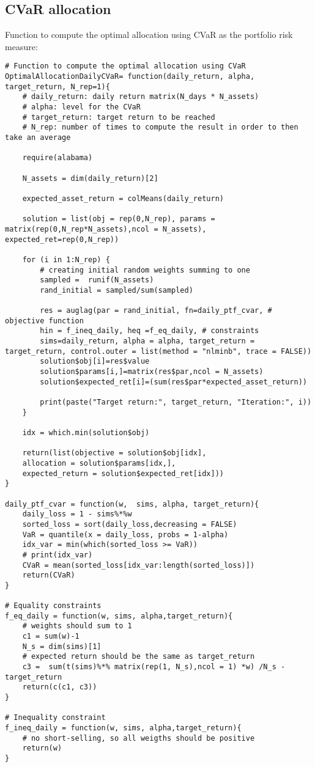 \subsection{CVaR allocation}

Function to compute the optimal allocation using CVaR as the portfolio risk measure:

\begin{lstlisting}
# Function to compute the optimal allocation using CVaR
OptimalAllocationDailyCVaR= function(daily_return, alpha, target_return, N_rep=1){
	# daily_return: daily return matrix(N_days * N_assets)
	# alpha: level for the CVaR
	# target_return: target return to be reached
	# N_rep: number of times to compute the result in order to then take an average
	
	require(alabama)
	
	N_assets = dim(daily_return)[2]
	
	expected_asset_return = colMeans(daily_return)
	
	solution = list(obj = rep(0,N_rep), params = matrix(rep(0,N_rep*N_assets),ncol = N_assets), expected_ret=rep(0,N_rep))
	
	for (i in 1:N_rep) {
		# creating initial random weights summing to one
		sampled =  runif(N_assets)
		rand_initial = sampled/sum(sampled)
		
		res = auglag(par = rand_initial, fn=daily_ptf_cvar, # objective function
		hin = f_ineq_daily, heq =f_eq_daily, # constraints
		sims=daily_return, alpha = alpha, target_return = target_return, control.outer = list(method = "nlminb", trace = FALSE))
		solution$obj[i]=res$value
		solution$params[i,]=matrix(res$par,ncol = N_assets)
		solution$expected_ret[i]=(sum(res$par*expected_asset_return))
		
		print(paste("Target return:", target_return, "Iteration:", i))
	}
	
	idx = which.min(solution$obj)
	
	return(list(objective = solution$obj[idx], 
	allocation = solution$params[idx,],
	expected_return = solution$expected_ret[idx]))
}

daily_ptf_cvar = function(w,  sims, alpha, target_return){
	daily_loss = 1 - sims%*%w
	sorted_loss = sort(daily_loss,decreasing = FALSE)
	VaR = quantile(x = daily_loss, probs = 1-alpha)
	idx_var = min(which(sorted_loss >= VaR))
	# print(idx_var)
	CVaR = mean(sorted_loss[idx_var:length(sorted_loss)])
	return(CVaR)
}

# Equality constraints
f_eq_daily = function(w, sims, alpha,target_return){
	# weights should sum to 1
	c1 = sum(w)-1 
	N_s = dim(sims)[1]
	# expected return should be the same as target_return
	c3 =  sum(t(sims)%*% matrix(rep(1, N_s),ncol = 1) *w) /N_s - target_return
	return(c(c1, c3))
}

# Inequality constraint
f_ineq_daily = function(w, sims, alpha,target_return){
	# no short-selling, so all weigths should be positive
	return(w)
}
\end{lstlisting}

